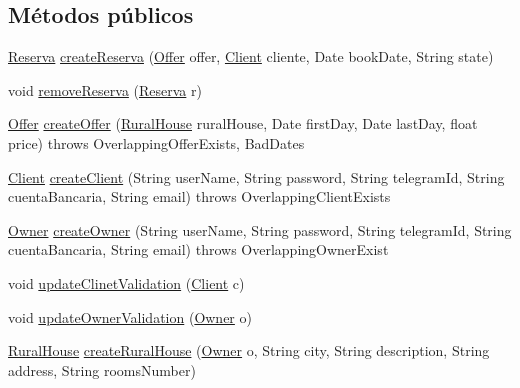 \subsection*{Métodos públicos}
\begin{DoxyCompactItemize}
\item 
\mbox{\hyperlink{classdomain_1_1_reserva}{Reserva}} \mbox{\hyperlink{interfacebusiness_logic_1_1_application_facade_interface_w_s_ad807cbd5d877e941edc274563e5cefa3}{create\+Reserva}} (\mbox{\hyperlink{classdomain_1_1_offer}{Offer}} offer, \mbox{\hyperlink{classdomain_1_1_client}{Client}} cliente, Date book\+Date, String state)
\item 
void \mbox{\hyperlink{interfacebusiness_logic_1_1_application_facade_interface_w_s_a0c4ed4fa98351e6aaba6f9769e561abf}{remove\+Reserva}} (\mbox{\hyperlink{classdomain_1_1_reserva}{Reserva}} r)
\item 
\mbox{\hyperlink{classdomain_1_1_offer}{Offer}} \mbox{\hyperlink{interfacebusiness_logic_1_1_application_facade_interface_w_s_a0e8d2135ef1384a32e74f60bcea55f09}{create\+Offer}} (\mbox{\hyperlink{classdomain_1_1_rural_house}{Rural\+House}} rural\+House, Date first\+Day, Date last\+Day, float price)  throws Overlapping\+Offer\+Exists, Bad\+Dates
\item 
\mbox{\hyperlink{classdomain_1_1_client}{Client}} \mbox{\hyperlink{interfacebusiness_logic_1_1_application_facade_interface_w_s_ac2cbd39795e0c171a79ac440698bd859}{create\+Client}} (String user\+Name, String password, String telegram\+Id, String cuenta\+Bancaria, String email)  throws Overlapping\+Client\+Exists
\item 
\mbox{\hyperlink{classdomain_1_1_owner}{Owner}} \mbox{\hyperlink{interfacebusiness_logic_1_1_application_facade_interface_w_s_a3e5553805d4890c9c17cf2ab1b14a2d3}{create\+Owner}} (String user\+Name, String password, String telegram\+Id, String cuenta\+Bancaria, String email)  throws Overlapping\+Owner\+Exist
\item 
void \mbox{\hyperlink{interfacebusiness_logic_1_1_application_facade_interface_w_s_a482571287e471d0047bc24150f716d72}{update\+Clinet\+Validation}} (\mbox{\hyperlink{classdomain_1_1_client}{Client}} c)
\item 
void \mbox{\hyperlink{interfacebusiness_logic_1_1_application_facade_interface_w_s_a4932653f88b16660fa74ff6356a3f94b}{update\+Owner\+Validation}} (\mbox{\hyperlink{classdomain_1_1_owner}{Owner}} o)
\item 
\mbox{\hyperlink{classdomain_1_1_rural_house}{Rural\+House}} \mbox{\hyperlink{interfacebusiness_logic_1_1_application_facade_interface_w_s_a624b00ae79c85436420d62cf34a082d7}{create\+Rural\+House}} (\mbox{\hyperlink{classdomain_1_1_owner}{Owner}} o, String city, String description, String address, String rooms\+Number)

\end{DoxyCompactItemize}
